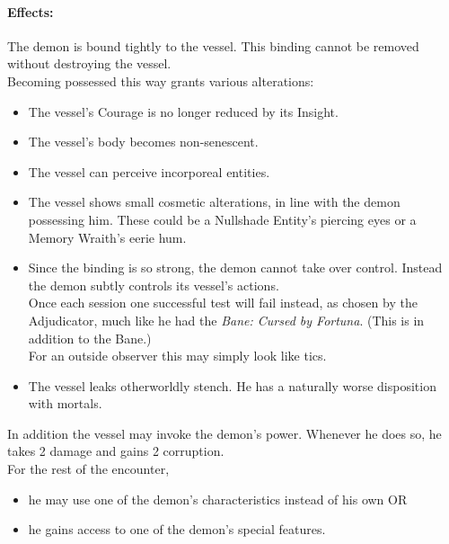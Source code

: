 \paragraph{Effects:}
The demon is bound tightly to the vessel.
This binding cannot be removed without destroying the vessel.
\\%
Becoming possessed this way grants various alterations:
\begin{itemize}
	\setlength\itemsep{-8mm} \vspace{-8mm}
	\item The vessel's Courage is no longer reduced by its Insight.
	\item The vessel's body becomes non-senescent.
	\item The vessel can perceive incorporeal entities.
	\item The vessel shows small cosmetic alterations, in line with the demon possessing him.
		These could be a Nullshade Entity's piercing eyes or a Memory Wraith's eerie hum.
	\item Since the binding is so strong, the demon cannot take over control.
		Instead the demon subtly controls its vessel's actions.
		\\%
		Once each session one successful test will fail instead, as chosen by the Adjudicator,
			much like he had the \emph{Bane: Cursed by Fortuna}.
		(This is in addition to the Bane.)
		\\%
		For an outside observer this may simply look like tics.
	\item The vessel leaks otherworldly stench.
		He has a naturally worse disposition with mortals.
\end{itemize}
In addition the vessel may invoke the demon's power.
Whenever he does so, he takes 2 damage and gains 2 corruption.
\\%
For the rest of the encounter,
\begin{itemize}
	\setlength\itemsep{-8mm} \vspace{-8mm}
	\item he may use one of the demon's characteristics instead of his own OR
	\item he gains access to one of the demon's special features.
\end{itemize}
